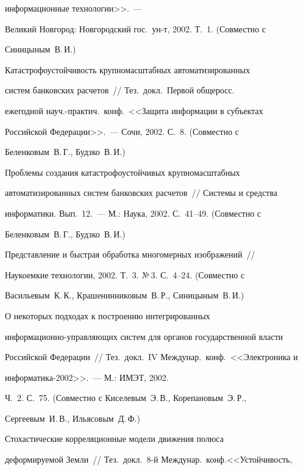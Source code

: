 информационные технологии>>.~---


Великий Новгород: Новгородский гос.\ ун-т, 2002. Т.~1. (Совместно с


Синицыным~В.\,И.)





 Катастрофоустойчивость крупномасштабных автоматизированных


систем банковских расчетов~// Тез.\ докл.\ Первой общеросс.\


ежегодной науч.-практич.\ конф.\ <<Защита информации в субъектах


Российской Федерации>>.~--- Сочи, 2002. С.~8. (Совместно с


Беленковым~В.\,Г., Будзко~В.\,И.)





 Проблемы создания катастрофоустойчивых крупномасштабных


автоматизированных систем банковских расчетов~// Системы и средства


информатики. Вып.~12.~--- М.: Наука, 2002. С.~41--49. (Совместно с


Беленковым~В.\,Г., Будзко~В.\,И.)





 Представление и быстрая обработка многомерных изображений~//


Наукоемкие технологии, 2002. Т.~3. №\,3. С.~4--24. (Совместно с


Васильевым~К.\,К., Крашенинниковым~В.\,Р., Синицыным~В.\,И.)





 О некоторых подходах к построению интегрированных


ин\-фор\-ма\-ци\-он\-но-управ\-ля\-ющих систем для органов государственной власти


Российской Федерации~// Тез.\ докл.\ IV Междунар.\ конф.\ <<Электроника и


информатика-2002>>.~--- М.: ИМЭТ, 2002.


Ч.~2. С.~75. (Совместно с Киселевым~Э.\,В., Корепановым~Э.\,Р.,


Сергеевым~И.\,В., Ильясовым~Д.\,Ф.)





 Стохастические корреляционные модели движения полюса


деформируемой Земли~// Тез.\ докл.\ 8-й Междунар.\ конф.\linebreak <<Устойчивость,



